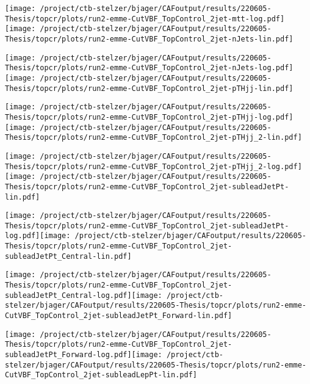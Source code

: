 \documentclass{article}
\begin{document}
\texttt{[image: /project/ctb-stelzer/bjager/CAFoutput/results/220605-Thesis/topcr/plots/run2-emme-CutVBF\_TopControl\_2jet-mtt-log.pdf]}\texttt{[image: /project/ctb-stelzer/bjager/CAFoutput/results/220605-Thesis/topcr/plots/run2-emme-CutVBF\_TopControl\_2jet-nJets-lin.pdf]}

\texttt{[image: /project/ctb-stelzer/bjager/CAFoutput/results/220605-Thesis/topcr/plots/run2-emme-CutVBF\_TopControl\_2jet-nJets-log.pdf]}\texttt{[image: /project/ctb-stelzer/bjager/CAFoutput/results/220605-Thesis/topcr/plots/run2-emme-CutVBF\_TopControl\_2jet-pTHjj-lin.pdf]}

\texttt{[image: /project/ctb-stelzer/bjager/CAFoutput/results/220605-Thesis/topcr/plots/run2-emme-CutVBF\_TopControl\_2jet-pTHjj-log.pdf]}\texttt{[image: /project/ctb-stelzer/bjager/CAFoutput/results/220605-Thesis/topcr/plots/run2-emme-CutVBF\_TopControl\_2jet-pTHjj\_2-lin.pdf]}

\texttt{[image: /project/ctb-stelzer/bjager/CAFoutput/results/220605-Thesis/topcr/plots/run2-emme-CutVBF\_TopControl\_2jet-pTHjj\_2-log.pdf]}\texttt{[image: /project/ctb-stelzer/bjager/CAFoutput/results/220605-Thesis/topcr/plots/run2-emme-CutVBF\_TopControl\_2jet-subleadJetPt-lin.pdf]}

\texttt{[image: /project/ctb-stelzer/bjager/CAFoutput/results/220605-Thesis/topcr/plots/run2-emme-CutVBF\_TopControl\_2jet-subleadJetPt-log.pdf]}\texttt{[image: /project/ctb-stelzer/bjager/CAFoutput/results/220605-Thesis/topcr/plots/run2-emme-CutVBF\_TopControl\_2jet-subleadJetPt\_Central-lin.pdf]}

\texttt{[image: /project/ctb-stelzer/bjager/CAFoutput/results/220605-Thesis/topcr/plots/run2-emme-CutVBF\_TopControl\_2jet-subleadJetPt\_Central-log.pdf]}\texttt{[image: /project/ctb-stelzer/bjager/CAFoutput/results/220605-Thesis/topcr/plots/run2-emme-CutVBF\_TopControl\_2jet-subleadJetPt\_Forward-lin.pdf]}

\texttt{[image: /project/ctb-stelzer/bjager/CAFoutput/results/220605-Thesis/topcr/plots/run2-emme-CutVBF\_TopControl\_2jet-subleadJetPt\_Forward-log.pdf]}\texttt{[image: /project/ctb-stelzer/bjager/CAFoutput/results/220605-Thesis/topcr/plots/run2-emme-CutVBF\_TopControl\_2jet-subleadLepPt-lin.pdf]}
\end{document}
